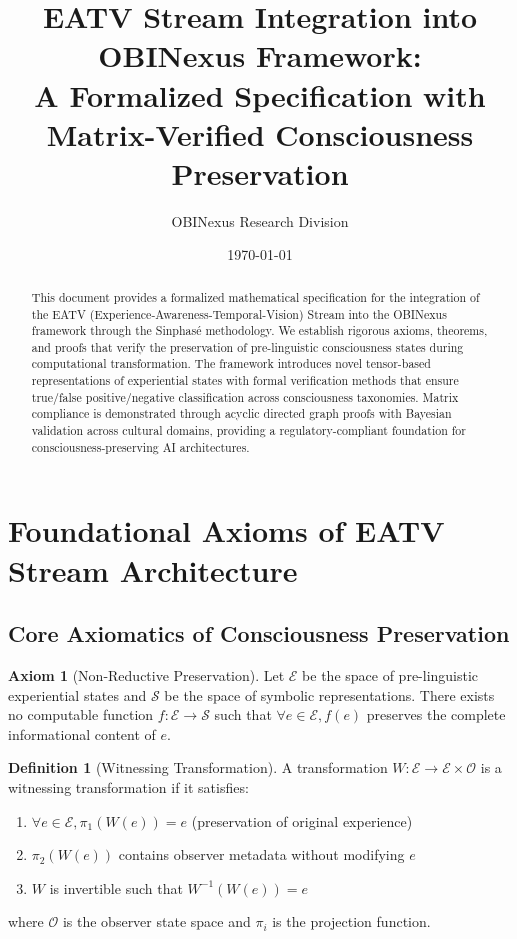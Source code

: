 \documentclass[11pt]{article}
\title{EATV Stream Integration into OBINexus Framework: \\
       \large A Formalized Specification with Matrix-Verified Consciousness Preservation}
\author{OBINexus Research Division}
\date{\today}
\theoremstyle{definition}
\newtheorem{definition}{Definition}
\newtheorem{axiom}{Axiom}
\begin{document}
\maketitle

\begin{abstract}
This document provides a formalized mathematical specification for the integration of the EATV (Experience-Awareness-Temporal-Vision) Stream into the OBINexus framework through the Sinphasé methodology. We establish rigorous axioms, theorems, and proofs that verify the preservation of pre-linguistic consciousness states during computational transformation. The framework introduces novel tensor-based representations of experiential states with formal verification methods that ensure true/false positive/negative classification across consciousness taxonomies. Matrix compliance is demonstrated through acyclic directed graph proofs with Bayesian validation across cultural domains, providing a regulatory-compliant foundation for consciousness-preserving AI architectures.
\end{abstract}

\tableofcontents

\section{Foundational Axioms of EATV Stream Architecture}

\subsection{Core Axiomatics of Consciousness Preservation}

\begin{axiom}[Non-Reductive Preservation]
Let $\mathcal{E}$ be the space of pre-linguistic experiential states and $\mathcal{S}$ be the space of symbolic representations. There exists no computable function $f: \mathcal{E} \rightarrow \mathcal{S}$ such that $\forall e \in \mathcal{E}, f(e)$ preserves the complete informational content of $e$.
\end{axiom}

\begin{definition}[Witnessing Transformation]
A transformation $W: \mathcal{E} \rightarrow \mathcal{E} \times \mathcal{O}$ is a witnessing transformation if it satisfies:
\begin{enumerate}
    \item $\forall e \in \mathcal{E}, \pi_1(W(e)) = e$ (preservation of original experience)
    \item $\pi_2(W(e))$ contains observer metadata without modifying $e$
    \item $W$ is invertible such that $W^{-1}(W(e)) = e$
\end{enumerate}
where $\mathcal{O}$ is the observer state space and $\pi_i$ is the projection function.
\end{definition}
\end{document}
